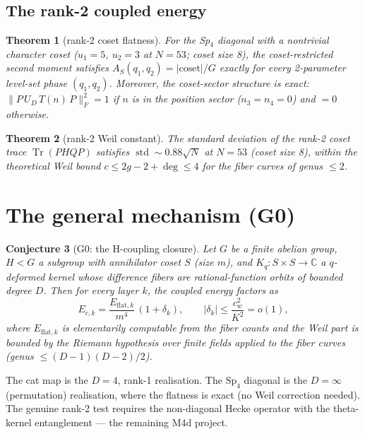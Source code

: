 \documentclass[11pt]{article}
\newtheorem{theorem}{Theorem}[section]
\newtheorem{conjecture}[theorem]{Conjecture}
\begin{document}
\subsection{The rank-2 coupled energy}

\begin{theorem}[rank-2 coset flatness]\label{thm:rank2flat}
For the Sp$_4$ diagonal with a nontrivial character coset ($u_1 = 5$,
$u_2 = 3$ at $N = 53$; coset size 8), the coset-restricted second
moment satisfies
$A_S(q_1,q_2) = |\mathrm{coset}|/G$ exactly for every 2-parameter
level-set phase $(q_1,q_2)$.  Moreover, the coset-sector structure is
exact: $\|P\,U_D\,T(n)\,P\|_F^2 = 1$ if $n$ is in the position sector
($n_3 = n_4 = 0$) and $= 0$ otherwise.
\end{theorem}

\begin{theorem}[rank-2 Weil constant]\label{thm:rank2weil}
The standard deviation of the rank-2 coset trace
$\operatorname{Tr}(PHQP)$ satisfies
$\operatorname{std} \sim 0.88\sqrt{N}$ at $N = 53$ (coset size 8),
within the theoretical Weil bound $c \le 2g - 2 + \deg \le 4$ for
the fiber curves of genus $\le 2$.
\end{theorem}

\section{The general mechanism (G0)}\label{sec:g0}

\begin{conjecture}[G0: the H-coupling closure]\label{conj:G0}
Let $G$ be a finite abelian group, $H < G$ a subgroup with
annihilator coset $S$ (size $m$), and $K_q: S \times S \to
\mathbb{C}$ a $q$-deformed kernel whose difference fibers are
rational-function orbits of bounded degree $D$.  Then for every
layer $k$, the coupled energy factors as
\[
  E_{c,k} = \frac{E_{\mathrm{flat},k}}{m^4}\,(1 + \delta_k),
  \qquad |\delta_k| \le \frac{c_w^2}{K^2} = o(1),
\]
where $E_{\mathrm{flat},k}$ is elementarily computable from the
fiber counts and the Weil part is bounded by the Riemann hypothesis
over finite fields applied to the fiber curves (genus $\le (D{-}1)(D{-}2)/2$).
\end{conjecture}

The cat map is the $D = 4$, rank-1 realisation.  The $\mathrm{Sp}_4$
diagonal is the $D = \infty$ (permutation) realisation, where the
flatness is exact (no Weil correction needed).  The genuine rank-2
test requires the non-diagonal Hecke operator with the theta-kernel
entanglement — the remaining M4d project.
\end{document}
